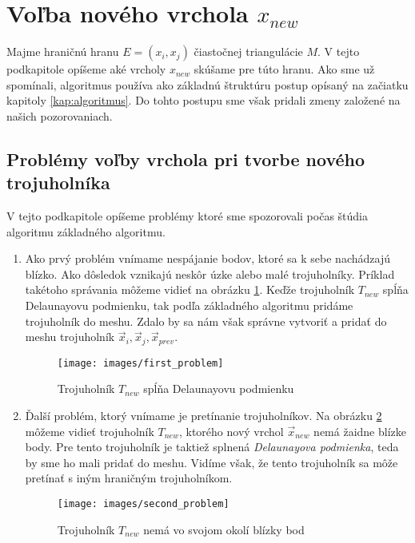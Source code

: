 \section{Voľba nového vrchola $x_{new}$}

Majme hraničnú hranu $E=(x_i, x_j)$ čiastočnej triangulácie $M$. V tejto podkapitole opíšeme 
aké vrcholy $x_{new}$ skúšame pre túto hranu. Ako sme už spomínali, algoritmus používa ako 
základnú štruktúru postup opísaný na začiatku kapitoly \ref{kap:algoritmus}. 
Do tohto postupu sme však pridali zmeny založené na našich pozorovaniach.

\subsection{Problémy voľby vrchola pri tvorbe nového trojuholníka}

V tejto podkapitole opíšeme problémy ktoré sme spozorovali počas štúdia algoritmu základného 
algoritmu.

\begin{enumerate}

\item{
    Ako prvý problém vnímame nespájanie bodov, ktoré sa k sebe nachádzajú blízko. Ako dôsledok vznikajú 
    neskôr úzke alebo malé trojuholníky. Príklad takétoho správania môžeme vidieť na obrázku 
    \ref{obr:first_problem}. Keďže trojuholník $T_{new}$ spĺňa Delaunayovu podmienku, tak podľa 
    základného algoritmu pridáme trojuholník do meshu. Zdalo by sa nám však správne vytvoriť a 
    pridať do meshu trojuholník $\overrightarrow{x}_i, \overrightarrow{x}_j, \overrightarrow{x}_{prev}$. 

    \begin{figure}
        \centerline{\texttt{[image: images/first\_problem]}}
        \caption[Trojuholník $T_{new}$ spĺňa Delaunayovu podmienku]{Trojuholník $T_{new}$ spĺňa Delaunayovu podmienku}
        \label{obr:first_problem}
    \end{figure}
}

\item{
    Ďalší problém, ktorý vnímame je pretínanie trojuholníkov. Na obrázku \ref{obr:second_problem} môžeme
    vidieť trojuholník $T_{new}$, ktorého nový vrchol $\overrightarrow{x}_{new}$ nemá žaidne blízke body. 
    Pre tento trojuholník je taktiež splnená \textit{Delaunayova podmienka}, teda by sme ho mali pridať 
    do meshu. Vidíme však, že tento trojuholník sa môže pretínať s iným hraničným trojuholníkom.

    \begin{figure}
        \centerline{\texttt{[image: images/second\_problem]}}
        \caption[Trojuholník $T_{new}$ nemá vo svojom okolí blízky bod]{Trojuholník $T_{new}$ nemá vo svojom okolí blízky bod}
        \label{obr:second_problem}
    \end{figure}
}

\end{enumerate}
  



